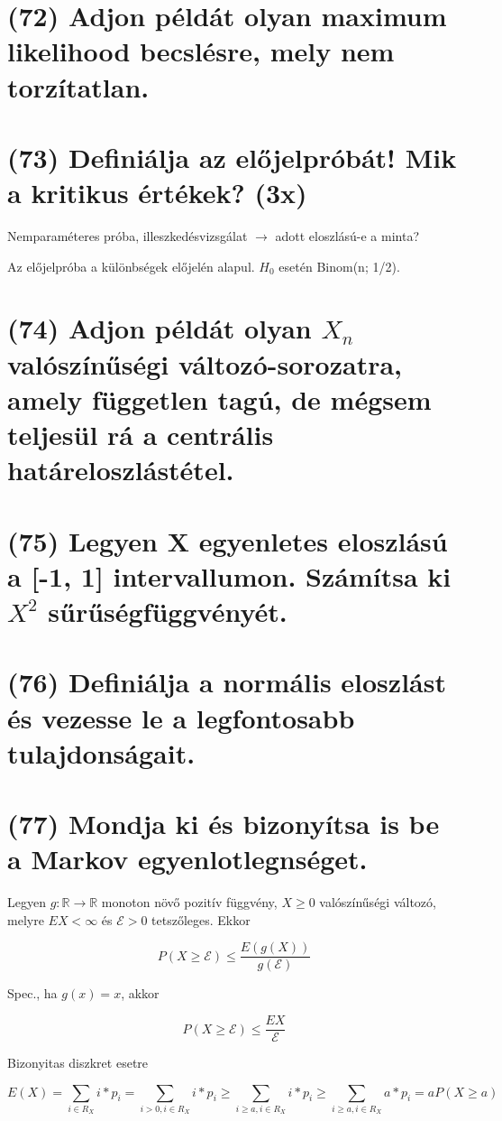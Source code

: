 \documentclass[12p]{article}
\begin{document}
\section{(72) Adjon példát olyan maximum likelihood becslésre, mely nem torzítatlan.}

\section{(73) Definiálja az előjelpróbát! Mik a kritikus értékek? (3x)}

Nemparaméteres próba, illeszkedésvizsgálat $\rightarrow$ adott eloszlású-e a minta?

Az előjelpróba a különbségek előjelén alapul. $H_0$ esetén Binom(n; 1/2).

\section{(74) Adjon példát olyan $X_n$ valószínűségi változó-sorozatra, amely független tagú, de mégsem teljesül rá a centrális határeloszlástétel.}

\section{(75) Legyen X egyenletes eloszlású a [-1, 1] intervallumon. Számítsa ki $X^2$ sűrűségfüggvényét.}

\section{(76) Definiálja a normális eloszlást és vezesse le a legfontosabb tulajdonságait.}

\section{(77) Mondja ki és bizonyítsa is be a Markov egyenlotlegnséget.}

Legyen $g : \mathbb{R} \rightarrow \mathbb{R}$ monoton növő pozitív függvény, $X \geq 0$ valószínűségi változó, melyre $EX < \infty$ és $\mathcal{E} > 0$ tetszőleges. Ekkor

$$P(X \geq \mathcal{E}) \leq \frac{E(g(X))}{g(\mathcal{E})}$$

Spec., ha $g(x) = x$, akkor

$$P(X \geq \mathcal{E}) \leq \frac{EX}{\mathcal{E}}$$

Bizonyitas diszkret esetre

$$E(X) = \sum_{i \in R_X} i*p_i = \sum_{i>0,i\in R_X} i*p_i \geq \sum_{i \geq a, i\in R_X} i*p_i \geq \sum_{i\geq a, i\in R_X} a*p_i = aP(X \geq a)$$
\end{document}
